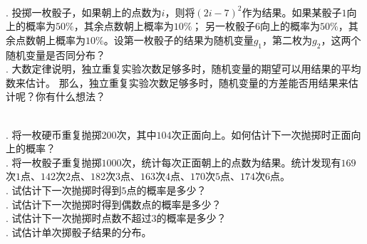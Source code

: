 \documentclass[12pt,UTF8,fontset=none]{ctexbook}
\begin{document}
\begin{sk}
    \mbox{}\\
    . 投掷一枚骰子，如果朝上的点数为$i$，则将$(2i-7)^2$作为结果。如果某骰子$1$向上的概率为$50\%$，其余点数朝上概率为$10\%$；
    另一枚骰子$6$向上的概率为$50\%$，其余点数朝上概率为$10\%$。设第一枚骰子的结果为随机变量$g_1$，第二枚为$g_2$，这两个随机变量是否同分布？\\
    . 大数定律说明，独立重复实验次数足够多时，随机变量的期望可以用结果的平均数来估计。
    那么，独立重复实验次数足够多时，随机变量的方差能否用结果来估计呢？你有什么想法？
\end{sk}

\begin{xt}
    \mbox{}\\
    . 将一枚硬币重复抛掷$200$次，其中$104$次正面向上。如何估计下一次抛掷时正面向上的概率？\\
    . 将一枚骰子重复抛掷$1000$次，统计每次正面朝上的点数为结果。统计发现有$169$次$1$点、$142$次$2$点、$182$次$3$点、$163$次$4$点、$170$次$5$点、$174$次$6$点。\\
    . 试估计下一次抛掷时得到$5$点的概率是多少？\\
    . 试估计下一次抛掷时得到偶数点的概率是多少？\\
    . 试估计下一次抛掷时点数不超过$3$的概率是多少？\\
    . 试估计单次掷骰子结果的分布。
\end{xt}
\end{document}

